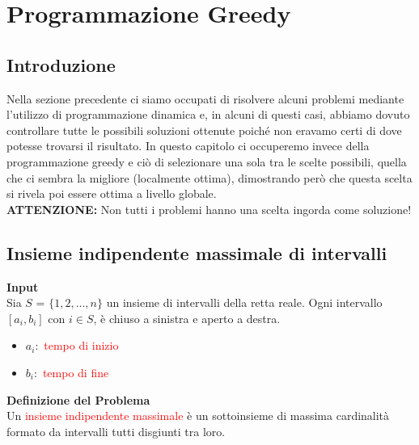 \documentclass[../cheatSheetAlgoritmi.tex]{subfiles}
\begin{document}
\section{Programmazione Greedy}
\subsection{Introduzione}
Nella sezione precedente ci siamo occupati di risolvere alcuni problemi mediante l'utilizzo di programmazione dinamica e, in alcuni di questi casi, abbiamo dovuto controllare tutte le possibili soluzioni ottenute poiché non eravamo certi di dove potesse trovarsi il risultato. In questo capitolo ci occuperemo invece della programmazione greedy e ciò di selezionare una sola tra le scelte possibili, quella che ci sembra la migliore (localmente ottima), dimostrando però che questa scelta si rivela poi essere ottima a livello globale.\\
\textbf{ATTENZIONE:} Non tutti i problemi hanno una scelta ingorda come soluzione!
\subsection{Insieme indipendente massimale di intervalli}
\textbf{Input}\\
Sia $S$ = $\{1, 2, ..., n\}$ un insieme di intervalli della retta reale. Ogni intervallo $[a_i, b_i]$ con $i \in S$, è chiuso a sinistra e aperto a destra.
\begin{itemize}
	\item  $a_i:$ \textcolor{red}{tempo di inizio}
	\item  $b_i:$ \textcolor{red}{tempo di fine}
\end{itemize}
\textbf{Definizione del Problema} \\
Un \textcolor{red}{insieme indipendente massimale} è un sottoinsieme di massima cardinalità formato da intervalli tutti disgiunti tra loro.
\end{document}
